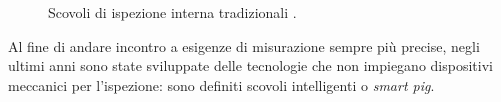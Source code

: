 \begin{figure}[htbp]
    \centering
     \qquad
\caption{Scovoli di ispezione interna tradizionali \parencite{williamson2015guide}.}
\label{fig:internalinspection}
\end{figure}

Al fine di andare incontro a esigenze di misurazione sempre più precise, negli ultimi anni sono state sviluppate delle tecnologie che non impiegano dispositivi meccanici per l'ispezione: sono definiti scovoli intelligenti o \textit{smart pig}.

